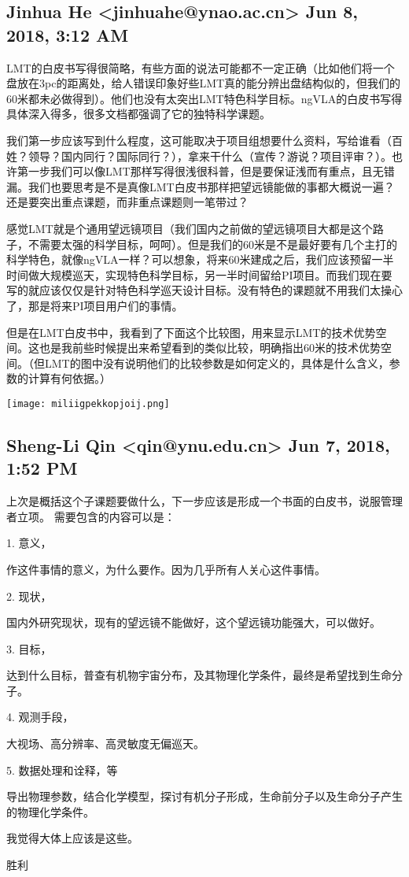 \documentclass{article}
\newcommand\from[2]{\subsection{{#1} {#2}}}
\newcommand\said[1]{#1}
\begin{document}
\from{
Jinhua He <jinhuahe@ynao.ac.cn>
}{
Jun 8, 2018, 3:12 AM
}

\said{
LMT的白皮书写得很简略，有些方面的说法可能都不一定正确（比如他们将一个盘放在3pc的距离处，给人错误印象好些LMT真的能分辨出盘结构似的，但我们的60米都未必做得到）。他们也没有太突出LMT特色科学目标。ngVLA的白皮书写得具体深入得多，很多文档都强调了它的独特科学课题。

我们第一步应该写到什么程度，这可能取决于项目组想要什么资料，写给谁看（百姓？领导？国内同行？国际同行？），拿来干什么（宣传？游说？项目评审？）。也许第一步我们可以像LMT那样写得很浅很科普，但是要保证浅而有重点，且无错漏。我们也要思考是不是真像LMT白皮书那样把望远镜能做的事都大概说一遍？还是要突出重点课题，而非重点课题则一笔带过？

感觉LMT就是个通用望远镜项目（我们国内之前做的望远镜项目大都是这个路子，不需要太强的科学目标，呵呵）。但是我们的60米是不是最好要有几个主打的科学特色，就像ngVLA一样？可以想象，将来60米建成之后，我们应该预留一半时间做大规模巡天，实现特色科学目标，另一半时间留给PI项目。而我们现在要写的就应该仅仅是针对特色科学巡天设计目标。没有特色的课题就不用我们太操心了，那是将来PI项目用户们的事情。

但是在LMT白皮书中，我看到了下面这个比较图，用来显示LMT的技术优势空间。这也是我前些时候提出来希望看到的类似比较，明确指出60米的技术优势空间。（但LMT的图中没有说明他们的比较参数是如何定义的，具体是什么含义，参数的计算有何依据。）

\texttt{[image: miliigpekkopjoij.png]}
}

\from{
Sheng-Li Qin <qin@ynu.edu.cn>
}{
Jun 7, 2018, 1:52 PM
}

\said{
     上次是概括这个子课题要做什么，下一步应该是形成一个书面的白皮书，说服管理者立项。 需要包含的内容可以是：

       1. 意义，

    作这件事情的意义，为什么要作。因为几乎所有人关心这件事情。

    2. 现状，

      国内外研究现状，现有的望远镜不能做好，这个望远镜功能强大，可以做好。

    3. 目标，

      达到什么目标，普查有机物宇宙分布，及其物理化学条件，最终是希望找到生命分子。

4. 观测手段，

  大视场、高分辨率、高灵敏度无偏巡天。

5. 数据处理和诠释，等

   导出物理参数，结合化学模型，探讨有机分子形成，生命前分子以及生命分子产生的物理化学条件。


我觉得大体上应该是这些。


胜利
}
\end{document}
